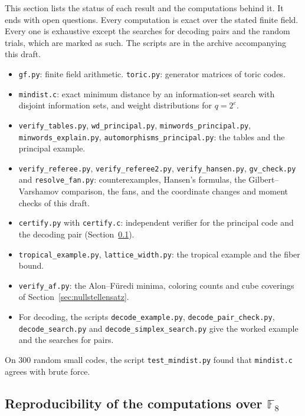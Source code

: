 \documentclass[12pt,letterpaper]{article}
\numberwithin{equation}{section}
\theoremstyle{definition}
\theoremstyle{remark}
\newcommand{\F}{\mathbb{F}}
\begin{document}
This section lists the status of each result and the computations behind it.
It ends with open questions. Every computation is exact over the stated
finite field. Every one is exhaustive except the searches for decoding pairs
and the random trials, which are marked as such. The scripts are in the archive accompanying this
draft.
\begingroup\raggedright
\begin{itemize}[leftmargin=*,itemsep=0pt]
\item \texttt{gf.py}: finite field arithmetic. \texttt{toric.py}: generator
matrices of toric codes.
\item \texttt{mindist.c}: exact minimum distance by an information-set search
with disjoint information sets, and weight distributions for $q=2^e$.
\item \texttt{verify\_tables.py}, \texttt{wd\_principal.py},
\texttt{minwords\_principal.py}, \texttt{minwords\_explain.py},
\texttt{automorphisms\_principal.py}: the tables and the principal example.
\item \texttt{verify\_referee.py}, \texttt{verify\_referee2.py},
\texttt{verify\_hansen.py}, \texttt{gv\_check.py} and
\texttt{resolve\_fan.py}: counterexamples, Hansen's formulas, the Gilbert--Varshamov comparison, the
fans, and the coordinate changes and moment checks of this draft.
\item \texttt{certify.py} with \texttt{certify.c}: independent verifier for
the principal code and the decoding pair (Section~\ref{sec:repro}).
\item \texttt{tropical\_example.py}, \texttt{lattice\_width.py}: the
tropical example and the fiber bound.
\item \texttt{verify\_af.py}: the Alon--F\"uredi minima, coloring counts and
cube coverings of Section~\ref{sec:nullstellensatz}.
\item For decoding, the scripts \texttt{decode\_example.py},
\texttt{decode\_pair\_check.py},
\texttt{decode\_search.py} and \texttt{decode\_\allowbreak simplex\_\allowbreak search.py}
give the worked example and the searches for pairs.
\end{itemize}
\endgroup
On $300$ random small codes, the script \texttt{test\_mindist.py} found
that \texttt{mindist.c} agrees with brute force.

\subsection{Reproducibility of the computations over \texorpdfstring{$\F_8$}{F8}}\label{sec:repro}
\end{document}
